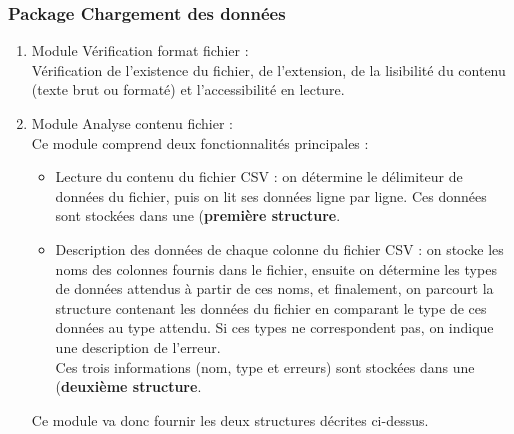 			\subsubsection*{Package Chargement des données}
			\begin{enumerate}
				\item Module Vérification format fichier :\\
				Vérification de l'existence du fichier, de l'extension, de la lisibilité du contenu (texte brut ou formaté) et l'accessibilité en lecture.
				\item Module Analyse contenu fichier :\\
				Ce module comprend deux fonctionnalités principales :
				\begin{itemize}[leftmargin=*]
					\item Lecture du contenu du fichier CSV : on détermine le délimiteur de données du fichier, puis on lit ses données ligne par ligne. Ces données sont stockées dans une (\textbf{première structure}.
					\item Description des données de chaque colonne du fichier CSV : on stocke les noms des colonnes fournis dans le fichier, ensuite on détermine les types de données attendus à partir de ces noms, et finalement, on parcourt la structure contenant les données du fichier en comparant le type de ces données au type attendu. Si ces types ne correspondent pas, on indique une description de l'erreur.\\
					Ces trois informations (nom, type et erreurs) sont stockées dans une (\textbf{deuxième structure}.
				\end{itemize}
				Ce module va donc fournir les deux structures décrites ci-dessus.
			\end{enumerate}
			
